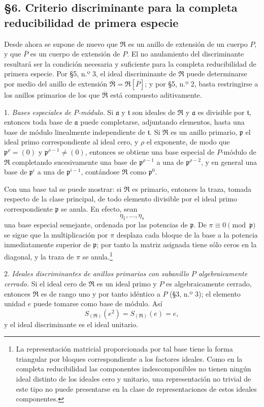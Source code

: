 \documentclass[11pt]{article}
\providecommand{\mR}{\mathfrak{R}}
\providecommand{\bR}{\overline{\mathfrak{R}}}
\providecommand{\ma}{\mathfrak{a}}
\providecommand{\mpideal}{\mathfrak{p}}
\providecommand{\mt}{\mathfrak{t}}
\providecommand{\bP}{\overline{P}}
\begin{document}
\subsection*{\S 6. Criterio discriminante para la completa reducibilidad de primera especie}

Desde ahora se supone de nuevo que $\mR$ es un anillo de extensión de un cuerpo $P$, y que $\bP$ es un cuerpo de extensión de $P$. El no anulamiento del discriminante resultará ser la condición necesaria y suficiente para la completa reducibilidad de primera especie. Por \S 5, n.º 3, el ideal discriminante de $\mR$ puede determinarse por medio del anillo de extensión $\bR=\mR[\bP]$; y por \S 5, n.º 2, basta restringirse a los anillos primarios de los que $\bR$ está compuesto aditivamente.

1. \emph{Bases especiales de $P$-módulo.} Si $\ma$ y $\mt$ son ideales de $\mR$ y $\ma$ es divisible por $\mt$, entonces toda base de $\ma$ puede completarse, adjuntando elementos, hasta una base de módulo linealmente independiente de $\mt$. Si $\mR$ es un anillo primario, $\mpideal$ el ideal primo correspondiente al ideal cero, y $\rho$ el exponente, de modo que $\mpideal^\rho=(0)$ y $\mpideal^{\rho-1}\ne(0)$, entonces se obtiene una base especial de $P$-módulo de $\mR$ completando sucesivamente una base de $\mpideal^{\rho-1}$ a una de $\mpideal^{\rho-2}$, y en general una base de $\mpideal^i$ a una de $\mpideal^{i-1}$, contándose $\mR$ como $\mpideal^0$.

Con una base tal se puede mostrar: si $\mR$ es primario, entonces la traza, tomada respecto de la clase principal, de todo elemento divisible por el ideal primo correspondiente $\mpideal$ se anula. En efecto, sean
\[
\eta_1,\ldots,\eta_s
\]
una base especial semejante, ordenada por las potencias de $\mpideal$. De $\pi\equiv0\pmod{\mpideal}$ se sigue que la multiplicación por $\pi$ desplaza cada bloque de la base a la potencia inmediatamente superior de $\mpideal$; por tanto la matriz asignada tiene sólo ceros en la diagonal, y la traza de $\pi$ se anula.\footnote{La representación matricial proporcionada por tal base tiene la forma triangular por bloques correspondiente a los factores ideales. Como en la completa reducibilidad las componentes indescomponibles no tienen ningún ideal distinto de los ideales cero y unitario, una representación no trivial de este tipo no puede presentarse en la clase de representaciones de estos ideales componentes.}

2. \emph{Ideales discriminantes de anillos primarios con subanillo $P$ algebraicamente cerrado.} Si el ideal cero de $\mR$ es un ideal primo y $P$ es algebraicamente cerrado, entonces $\mR$ es de rango uno y por tanto idéntico a $P$ (\S 3, n.º 3); el elemento unidad $e$ puede tomarse como base de módulo. Así
\[
        S_{(\mR)}(e^2)=S_{(\mR)}(e)=e,
\]
y el ideal discriminante es el ideal unitario.
\end{document}
